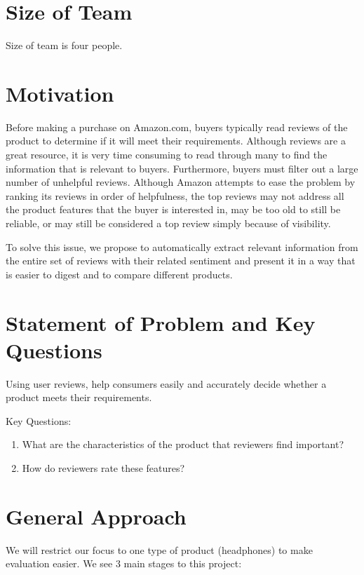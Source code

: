 \documentclass{article}
\begin{document}
 


\section{Size of Team}
Size of team is four people. 

\section{Motivation} 
 
Before making a purchase on Amazon.com, buyers typically read reviews of the product to determine if it will meet their requirements. Although reviews are a great resource, it is very time consuming to read through many to find the information that is relevant to buyers. Furthermore, buyers must filter out a large number of unhelpful reviews. Although Amazon attempts to ease the problem by ranking its reviews in order of helpfulness, the top reviews may not address all the product features that the buyer is interested in, may be too old to still be reliable, or may still be considered a top review simply because of visibility. 

To solve this issue, we propose to automatically extract relevant information from the entire set of reviews with their related sentiment and present it in a way that is easier to digest and to compare different products.

\section{Statement of Problem and Key Questions} 

Using user reviews, help consumers easily and accurately decide whether a product meets their requirements. 

Key Questions:

\begin{enumerate}
\item What are the characteristics of the product that reviewers find important?
\item How do reviewers rate these features?
\end{enumerate}

\section{General Approach}
We will restrict our focus to one type of product (headphones) to make evaluation easier. We see 3 main stages to this project:
\end{document}
